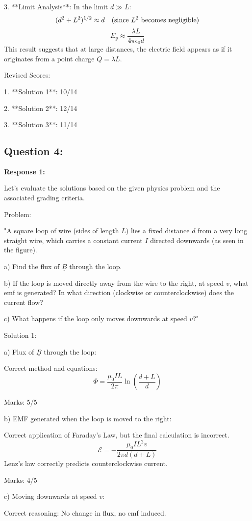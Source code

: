 \documentclass[a4paper,11pt]{article}
\begin{document}
3. **Limit Analysis**: In the limit \( d \gg L \):
    \[
    (d^2 + L^2)^{1/2} \approx d \quad \text{(since \( L^2 \) becomes negligible)}
    \]
    \[
    E_y \approx \frac{\lambda L}{4\pi\epsilon_0 d}
    \]
    This result suggests that at large distances, the electric field appears as if it originates from a point charge \( Q = \lambda L \).

Revised Scores:

1. **Solution 1**: 10/14

2. **Solution 2**: 12/14

3. **Solution 3**: 11/14

\subsection*{Question 4:}

\textbf{Response 1:}

Let's evaluate the solutions based on the given physics problem and the associated grading criteria.

Problem:

"A square loop of wire (sides of length \( L \)) lies a fixed distance \( d \) from a very long straight wire, which carries a constant current \( I \) directed downwards (as seen in the figure).

a) Find the flux of \( \underline{B} \) through the loop.

b) If the loop is moved directly away from the wire to the right, at speed \( v \), what emf is generated? In what direction (clockwise or counterclockwise) does the current flow?

c) What happens if the loop only moves downwards at speed \( v \)?"

Solution 1:

a) Flux of \( \underline{B} \) through the loop:

Correct method and equations:
\[
\Phi = \frac{\mu_0 I L}{2 \pi} \ln\left(\frac{d+L}{d}\right)
\]

Marks: 5/5

b) EMF generated when the loop is moved to the right:

Correct application of Faraday's Law, but the final calculation is incorrect. 
\[
\mathcal{E} = -\frac{\mu_0 I L^2 v}{2 \pi d(d+L)}
\]
Lenz's law correctly predicts counterclockwise current.

Marks: 4/5

c) Moving downwards at speed \( v \):

Correct reasoning: No change in flux, no emf induced.
\end{document}
